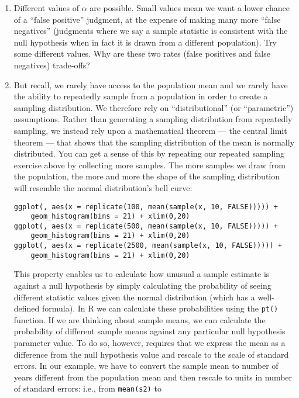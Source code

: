 \documentclass[a4paper,12pt]{article}
\begin{document}
\begin{enumerate}
\item Different values of $\alpha$ are possible. Small values mean we want a lower chance of a ``false positive'' judgment, at the expense of making many more ``false negatives'' (judgments where we say a sample statistic is consistent with the null hypothesis when in fact it is drawn from a different population). Try some different values. Why are these two rates (false positives and false negatives) trade-offs?

\item But recall, we rarely have access to the population mean and we rarely have the ability to repeatedly sample from a population in order to create a sampling distribution. We therefore rely on ``distributional'' (or ``parametric'') assumptions. Rather than generating a sampling distribution from repeatedly sampling, we instead rely upon a mathematical theorem --- the central limit theorem --- that shows that the sampling distribution of the mean is normally distributed. You can get a sense of this by repeating our repeated sampling exercise above by collecting more samples. The more samples we draw from the population, the more and more the shape of the sampling distribution will resemble the normal distribution's bell curve:

\begin{verbatim}
ggplot(, aes(x = replicate(100, mean(sample(x, 10, FALSE))))) +
    geom_histogram(bins = 21) + xlim(0,20)
ggplot(, aes(x = replicate(500, mean(sample(x, 10, FALSE))))) +
    geom_histogram(bins = 21) + xlim(0,20)
ggplot(, aes(x = replicate(2500, mean(sample(x, 10, FALSE))))) +
    geom_histogram(bins = 21) + xlim(0,20)
\end{verbatim}

\noindent This property enables us to calculate how unusual a sample estimate is against a null hypothesis by simply calculating the probability of seeing different statistic values given the normal distribution (which has a well-defined formula). In R we can calculate these probabilities using the \texttt{pt()} function. If we are thinking about sample means, we can calculate the probability of different sample means against any particular null hypothesis parameter value. To do so, however, requires that we express the mean as a difference from the null hypothesis value and rescale to the scale of standard errors. In our example, we have to convert the sample mean to number of years different from the population mean and then rescale to units in number of standard errors: i.e., from \texttt{mean(s2)} to 


\end{enumerate}
\end{document}
